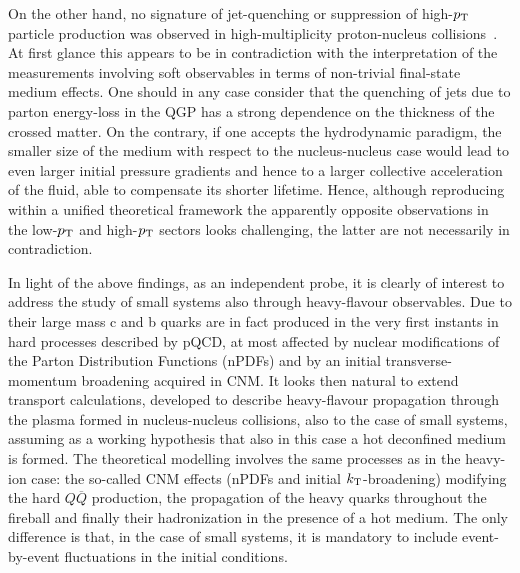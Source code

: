 On the other hand, no signature of jet-quenching or suppression of high-$p\sb{\scriptstyle\mathrm{T}}$ particle production was observed in high-multiplicity proton-nucleus collisions~\cite{Acharya:2018qsh}.  At first glance this appears to be in contradiction with the interpretation of the  measurements involving soft observables in terms of non-trivial final-state medium effects. One should in any case consider that the quenching of jets due to parton energy-loss in the QGP has a strong dependence on the thickness of the crossed matter.
On the contrary, if one accepts the hydrodynamic paradigm, the smaller size of the medium with respect to the nucleus-nucleus case would lead to even larger initial pressure gradients and hence to a larger collective acceleration of the fluid, able to compensate its shorter lifetime. Hence, although reproducing within a unified theoretical framework the apparently opposite observations in the low-$p\sb{\scriptstyle\mathrm{T}}$ and high-$p\sb{\scriptstyle\mathrm{T}}$ sectors looks challenging, the latter are not necessarily in contradiction.

In light of the above findings, as an independent probe, it is clearly of interest to address the study of small systems also through heavy-flavour observables. Due to their large mass c and b quarks are in fact produced in the very first instants in hard processes described by pQCD, at most affected by nuclear modifications of the Parton Distribution Functions (nPDFs) and by an initial transverse-momentum broadening acquired in CNM. %
It looks then natural to extend transport calculations, developed to describe heavy-flavour propagation through the plasma formed in nucleus-nucleus collisions, also to the case of small systems, assuming as a working hypothesis that also in this case a hot deconfined medium is formed. The theoretical modelling involves the same processes as in the heavy-ion case: the so-called CNM effects (nPDFs and initial $k_{\rm T}$-broadening) modifying the hard $Q\overline{Q}$ production, the propagation of the heavy quarks throughout the fireball and finally their hadronization in the presence of a hot medium. The only difference is that, in the case of small systems, it is mandatory to include event-by-event fluctuations in the initial conditions.

